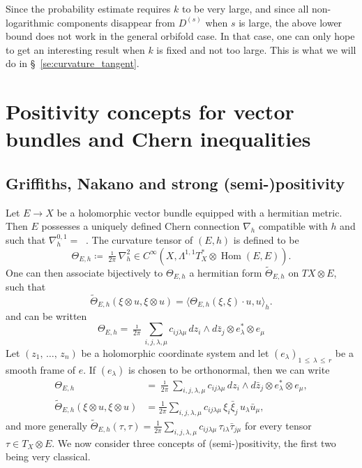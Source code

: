 \documentclass[AHL,Unicode,longabstracts,published]{cedram}
\DeclareMathOperator{\Hom}{Hom}
\DeclareMathOperator{\dbar}{\bar\partial}
\let\leq\leqslant
\newcommand*\bydef{\coloneqq}
\begin{document}
\begin{rema}
Since the probability estimate requires $k$ to be very large, and since all non-logarithmic components disappear from $D^{(s)}$ when $s$ is large, the above lower bound does not work in the general orbifold case. In that case, one can only hope to get an interesting result when $k$ is fixed and not too large. This is what we will do in \S~\ref{se:curvature_tangent}.
\end{rema}

\section{Positivity concepts for vector bundles and Chern inequalities}\label{se:Chern_inequalities}
\subsection{Griffiths, Nakano and strong (semi-)positivity} Let $E\to X$ be a holomorphic vector bundle equipped with a hermitian metric. Then $E$ possesses a uniquely defined Chern connection $\nabla_h$ compatible with $h$ and such that $\nabla_h^ {0,1}=\dbar$. The curvature tensor of $(E,h)$ is defined to be
\[
\Theta_{E,h}
\bydef
\tfrac{\imath}{ 2\pi}
\nabla_h^2\in C^\infty\left(X,\Lambda^{1,1}T^*_X\otimes\Hom(E,E)\right).
\]
One can then associate bijectively to $\Theta_{E,h}$ a hermitian form
$\widetilde\Theta_{E,h}$ on $TX\otimes E$, such that
\[
\widetilde\Theta_{E,h}(\xi\otimes u,\xi\otimes u)=
\langle\Theta_{E,h}(\xi,\xi)\cdot u,u\rangle_h.
\]
and can be written
\[
\Theta_{E,h}=
\tfrac{\imath}{ 2\pi}
\sum_{i,j,\lambda,\mu} c_{ij\lambda\mu}\,dz_i\wedge d\bar z_j\otimes e_\lambda^*\otimes e_\mu
\]
Let $(z_1,\,\dotsc,\,z_n)$ be a holomorphic coordinate system and let $(e_\lambda)_{1\,\leq\,\lambda\,\leq\,r}$ be a smooth frame of $e$. If $(e_\lambda)$ is chosen to be orthonormal, then we can write
\begin{align*}
\Theta_{E,h} &=
\tfrac{\imath}{ 2\pi}
\sum_{i,j,\lambda,\mu} c_{ij\lambda\mu}\,dz_i\wedge d\bar z_j\otimes e_\lambda^*\otimes e_\mu,
\\
\widetilde\Theta_{E,h}(\xi\otimes u,\xi\otimes u)&=\tfrac{1}{ 2\pi}
\sum_{i,j,\lambda,\mu} c_{ij\lambda\mu}\,\xi_i\bar\xi_j\,u_\lambda\bar u_\mu,
\end{align*}
and more generally
$\widetilde\Theta_{E,h}(\tau,\tau)=\tfrac{1}{ 2\pi} \sum_{i,j,\lambda,\mu}c_{ij\lambda\mu}\,\tau_{i\lambda}\bar \tau_{j\mu}$ for every tensor $\tau\in T_X\otimes E$. We now consider three concepts of (semi-)positivity, the first two being very classical.
\end{document}
